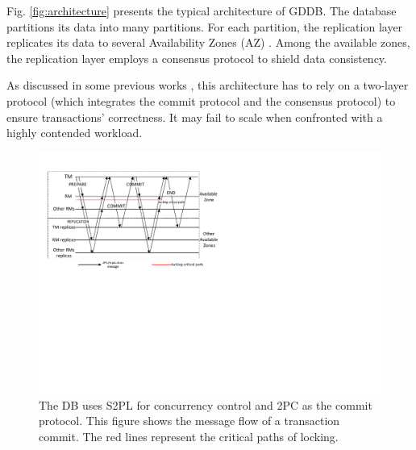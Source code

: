 \documentclass[conference]{IEEEtran}
\begin{document}
Fig.    \ref{fig:architecture} presents the typical architecture of GDDB.
The database partitions its data into many partitions.
For each partition, the replication layer replicates its data to several Availability Zones (AZ) \cite{Aurora:conf/sigmod/VerbitskiGSCGBM18}.
Among the available zones, the replication layer employs a consensus protocol to shield data consistency.

As discussed in some previous works \cite{Calvin:conf/sigmod/ThomsonDWRSA12}\cite{Tapir:conf/sosp/ZhangSSKP15}\cite{Janus:conf/osdi/MuNLL16},
this architecture has to rely on a two-layer protocol (which integrates the commit protocol and the consensus protocol) to ensure transactions' correctness.
It may fail to scale when confronted with a highly contended workload.


\begin{figure}[tbp]
  \centerline{\includegraphics[scale=0.60]{figure/message_flow.pdf}}
  \caption
  {
The DB uses S2PL for concurrency control and 2PC as the commit protocol.
This figure shows the message flow of a transaction commit.
The red lines represent the critical paths of locking.
    }
\label{fig:message_flow}
\end{figure}
\end{document}
